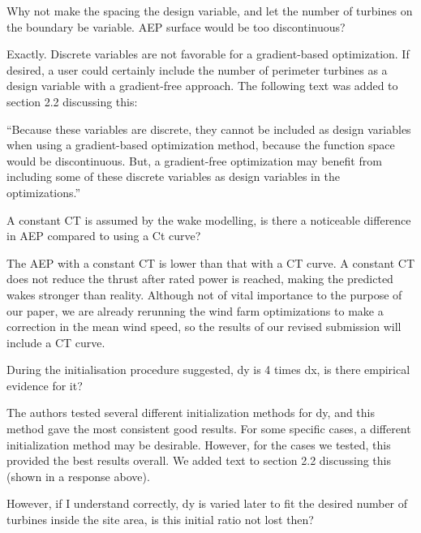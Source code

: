 \documentclass[12pt]{report}
\begin{document}
\color{black}
\bigskip

Why not make the spacing the design variable, and let the number of turbines on the boundary be variable. AEP surface would be too discontinuous? 

\bigskip
\color{blue}

Exactly. Discrete variables are not favorable for a gradient-based optimization. If desired, a user could certainly include the number of perimeter turbines as a design variable with a gradient-free approach. The following text was added to section 2.2 discussing this:

``Because these variables are discrete, they cannot be included as design variables when using a gradient-based optimization method, because the function space would be discontinuous. But, a gradient-free optimization may benefit from including some of these discrete variables as design variables in the optimizations.''

\color{black}
\bigskip

A constant CT is assumed by the wake modelling, is there a noticeable difference in AEP compared to using a Ct curve? 

\bigskip
\color{blue}

The AEP with a constant CT is lower than that with a CT curve. A constant CT does not reduce the thrust after rated power is reached, making the predicted wakes stronger than reality. Although not of vital importance to the purpose of our paper, we are already rerunning the wind farm optimizations to make a correction in the mean wind speed, so the results of our revised submission will include a CT curve.

\color{black}
\bigskip

During the initialisation procedure suggested, dy is 4 times dx, is there empirical evidence for it? 

\bigskip
\color{blue}

The authors tested several different initialization methods for dy, and this method gave the most consistent good results. For some specific cases, a different initialization method may be desirable. However, for the cases we tested, this provided the best results overall. We added text to section 2.2 discussing this (shown in a response above).

\color{black}
\bigskip

However, if I understand correctly, dy is varied later to fit the desired number of turbines inside the site area, is this initial ratio not lost then? 
\end{document}
